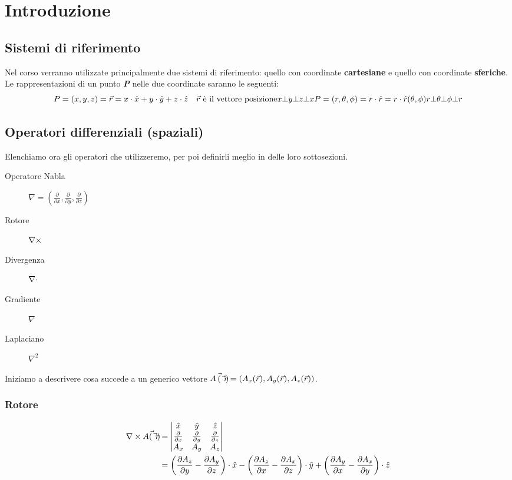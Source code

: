 \chapter{Introduzione}
\section{Sistemi di riferimento}
Nel corso verranno utilizzate principalmente due sistemi di riferimento: quello
con coordinate \textbf{cartesiane} e quello con coordinate \textbf{sferiche}.
Le rappresentazioni di un punto \textit{\textbf{P}} nelle due coordinate saranno le seguenti:
\begin{equation}
  P=(x,y,z) = \vec{r} = x \cdot \hat{x} + y \cdot \hat{y} +z \cdot \hat{z}  \quad \vec{r}\text{ è il vettore posizione} \\
  x \bot y \bot z \bot x \\
  P=(r,\theta,\phi) = r \cdot \hat{r} = r \cdot \hat{r}(\theta,\phi)\\
  r \bot \theta \bot \phi \bot r
  \label{eq:riferimento}
\end{equation}

\section{Operatori differenziali (spaziali)}
Elenchiamo ora gli operatori che utilizzeremo, per poi definirli meglio in delle loro sottosezioni.
\begin{description}
  \item[Operatore Nabla] $ \nabla = \left(\frac{\partial}{\partial x},\frac{\partial}{\partial y},\frac{\partial}{\partial z}\right)$
  \item[Rotore] $\nabla\times$
  \item[Divergenza] $\nabla\cdot$
  \item[Gradiente] $\nabla$
  \item[Laplaciano] $\nabla^2$
\end{description}
Iniziamo a descrivere cosa succede a un generico vettore $\vec{A\left(\vec{r}\right)}=\left(A_x(\vec{r}),A_y(\vec{r}),A_z(\vec{r})\right)$.
\subsection{Rotore}
\begin{equation} \begin{split}
  \nabla\times \vec{A(\vec{r})} &=
  \begin{vmatrix}
    \hat{x} &\hat{y} &\hat{z} \\
    \frac{\partial}{\partial x} & \frac{\partial}{\partial y} & \frac{\partial}{\partial z} \\
    A_x & A_y & A_z
  \end{vmatrix} \\
  &= \left(\frac{\partial A_z}{\partial y} - \frac{\partial A_y}{\partial z}\right)\cdot \hat{x} -
  \left(\frac{\partial A_z}{\partial x} - \frac{\partial A_x}{\partial z}\right)\cdot \hat{y} +
  \left(\frac{\partial A_y}{\partial x} - \frac{\partial A_x}{\partial y}\right)\cdot \hat{z}
\end{split}\end{equation}

